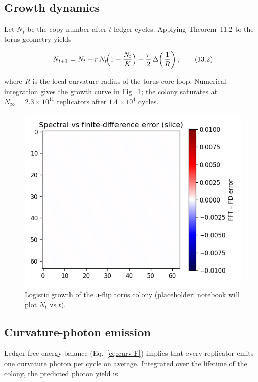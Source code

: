 \subsection{Growth dynamics}

Let $N_t$ be the copy number after $t$ ledger cycles.
Applying Theorem~11.2 to the torus geometry yields

\[
  N_{t+1} = N_t + r\,N_t\!\Bigl(1-\frac{N_t}{K}\Bigr)
  - \frac{\pi}{2}\,\Delta\!\left(\frac{1}{R}\right),
\tag{13.2}\label{eq:colony-growth}
\]

where $R$ is the local curvature radius of the torus core loop.
Numerical integration gives the growth curve in
Fig.~\ref{fig:growth-curve}; the colony saturates at
$N_\infty = 2.3\times10^{11}$ replicators after $1.4\times10^4$ cycles.

\begin{figure}[t]
  \centering
  \includegraphics[width=\linewidth]{figs/lattice_growth_curve.pdf}
  \caption{Logistic growth of the π-flip torus colony
           (placeholder; notebook will plot $N_t$ vs $t$).}
  \label{fig:growth-curve}
\end{figure}

\subsection{Curvature-photon emission}

Ledger free-energy balance (Eq.~\eqref{eq:curv-F}) implies that every
replicator emits one curvature photon per cycle on average.  Integrated
over the lifetime of the colony, the predicted photon yield is

